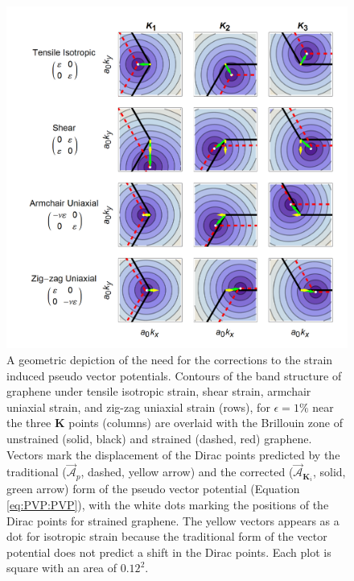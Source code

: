\begin{figure}
  \begin{center}
  \includegraphics[scale=.75]{Figs_PVP/VPs.png}
  \end{center}
  \caption[A geometric depiction of the need for the corrections to the strain induced pseudo vector potentials]{A geometric depiction of the need for the corrections to the strain induced pseudo vector potentials.  Contours of the band structure of graphene under tensile isotropic strain, shear strain, armchair uniaxial strain, and zig-zag uniaxial strain (rows), for $\epsilon=1\%$ near the three $\bm{K}$ points (columns) are overlaid with the Brillouin zone of unstrained (solid, black)  and strained (dashed, red) graphene. Vectors mark the displacement of the Dirac points predicted by the traditional ($\vec{\mathcal{A}}_p$, dashed, yellow arrow) and the corrected ($\vec{\mathcal{A}}_{\bm{K}_{i}}$, solid, green arrow) form of the pseudo vector potential (Equation \ref{eq:PVP:PVP}), with the white dots marking the positions of the Dirac points for strained graphene. The yellow vectors appears as a dot for isotropic strain because the traditional form of the vector potential does not predict a shift in the Dirac points.  Each plot is square with an area of $0.12^2$. \label{fig:PVP:PVPshifts}}
\end{figure}

